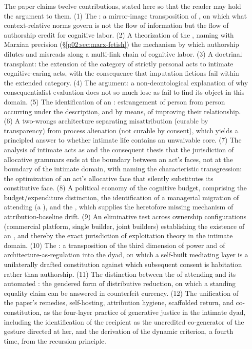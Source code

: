 The paper claims twelve contributions, stated here so that the reader may hold the argument to them. (1) The : a mirror-image transposition of \textcite{nissenbaum2009privacy}, on which what context-relative norms govern is not the flow of information but the flow of authorship credit for cognitive labor. (2) A theorization of the , naming with Marxian precision (\S\ref{p02:sec:marx-fetish}) the mechanism by which authorship dilutes and misreads along a multi-link chain of cognitive labor. (3) A doctrinal transplant: the extension of the category of strictly personal acts to intimate cognitive-caring acts, with the consequence that imputation fictions fail within the extended category. (4) The  argument: a non-deontological explanation of why consequentialist evaluation does not so much lose as fail to find its object in this domain. (5) The identification of an : estrangement of person from person occurring under the description, and by means, of improving their relationship. (6) A two-wrongs architecture separating misattribution (curable by transparency) from process alienation (not curable by consent), which yields a principled answer to whether intimate life contains an unwaivable core. (7) The analysis of intimate acts as  and the consequent thesis that the jurisdiction of allocative grammars ends at the boundary between an act's faces, not at the boundary of the intimate domain, with  naming the characteristic transgression: the optimization of an act's allocative face that silently substitutes its constitutive face. (8) A political economy of the cognitive budget, comprising the budget/expenditure distinction, the identification of a managerial migration of attending (a ), and the , which supplies the heretofore missing mechanism of attribution-baseline drift. (9) An eliminative test across ownership configurations (commercial platform, single builder, joint builders) establishing the existence of an , and thereby the exact jurisdiction of exploitation theory in the intimate domain. (10) The : a transposition of the third dimension of power and of architecture-as-regulation into the dyad, on which a self-built mediating layer is a unilaterally drafted constitution against which subsequent consent is habitation rather than authorship. (11) The distinction between the  of attending and its automated : the gendered form of distributive reduction, on which a standing equality claim can be answered in counterfeit currency. (12) The unification of the paper's remedies, self-hosting, attribution hygiene, scaffolded return, and co-constitution, as the four-layer practice of generative justice in the intimate dyad, including the identification of the recipient as the uncredited co-generator of the gesture directed at her, and the derivation of the dynamic criterion, a fourth time, from the recursion principle.

